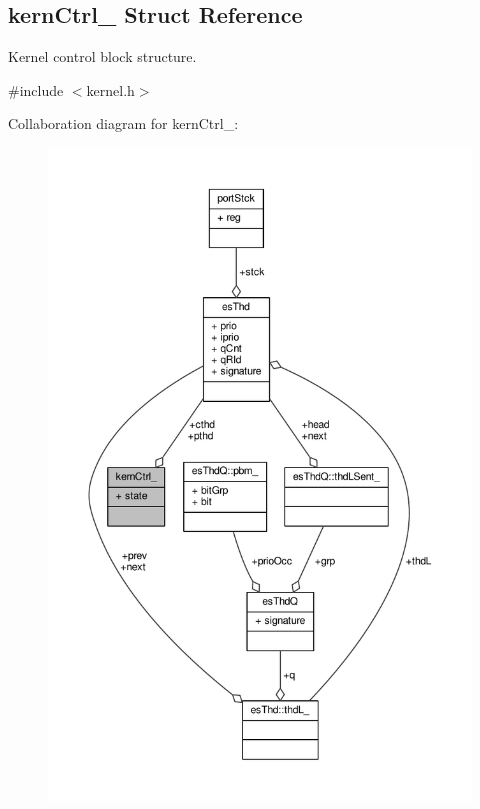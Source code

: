 \hypertarget{structkernCtrl__}{\subsection{kern\-Ctrl\-\_\- Struct Reference}
\label{structkernCtrl__}
}


Kernel control block structure.  




{\ttfamily \#include $<$kernel.\-h$>$}



Collaboration diagram for kern\-Ctrl\-\_\-\-:\nopagebreak
\begin{figure}[H]
\begin{center}
\leavevmode
\includegraphics[width=350pt]{structkernCtrl____coll__graph}
\end{center}
\end{figure}
